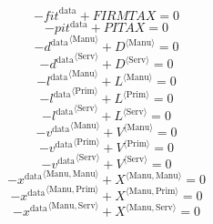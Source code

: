 \begin{equation}
-{f\!i\!t}^{\mathrm{data}} + {F\!I\!R\!M\!T\!A\!X} = 0
\end{equation}
\begin{equation}
-{p\!i\!t}^{\mathrm{data}} + {P\!I\!T\!A\!X} = 0
\end{equation}
\begin{equation}
-{d^{\mathrm{data}}}^{\langle \mathrm{\mathrm{Manu}}\rangle} + {D}^{\langle \mathrm{Manu}\rangle} = 0
\end{equation}
\begin{equation}
-{d^{\mathrm{data}}}^{\langle \mathrm{\mathrm{Serv}}\rangle} + {D}^{\langle \mathrm{Serv}\rangle} = 0
\end{equation}
\begin{equation}
-{l^{\mathrm{data}}}^{\langle \mathrm{\mathrm{Manu}}\rangle} + {L}^{\langle \mathrm{Manu}\rangle} = 0
\end{equation}
\begin{equation}
-{l^{\mathrm{data}}}^{\langle \mathrm{\mathrm{Prim}}\rangle} + {L}^{\langle \mathrm{Prim}\rangle} = 0
\end{equation}
\begin{equation}
-{l^{\mathrm{data}}}^{\langle \mathrm{\mathrm{Serv}}\rangle} + {L}^{\langle \mathrm{Serv}\rangle} = 0
\end{equation}
\begin{equation}
-{v^{\mathrm{data}}}^{\langle \mathrm{\mathrm{Manu}}\rangle} + {V}^{\langle \mathrm{Manu}\rangle} = 0
\end{equation}
\begin{equation}
-{v^{\mathrm{data}}}^{\langle \mathrm{\mathrm{Prim}}\rangle} + {V}^{\langle \mathrm{Prim}\rangle} = 0
\end{equation}
\begin{equation}
-{v^{\mathrm{data}}}^{\langle \mathrm{\mathrm{Serv}}\rangle} + {V}^{\langle \mathrm{Serv}\rangle} = 0
\end{equation}
\begin{equation}
-{x^{\mathrm{data}}}^{\langle \mathrm{\mathrm{Manu}},\mathrm{\mathrm{Manu}}\rangle} + {X}^{\langle \mathrm{Manu},\mathrm{Manu}\rangle} = 0
\end{equation}
\begin{equation}
-{x^{\mathrm{data}}}^{\langle \mathrm{\mathrm{Manu}},\mathrm{\mathrm{Prim}}\rangle} + {X}^{\langle \mathrm{Manu},\mathrm{Prim}\rangle} = 0
\end{equation}
\begin{equation}
-{x^{\mathrm{data}}}^{\langle \mathrm{\mathrm{Manu}},\mathrm{\mathrm{Serv}}\rangle} + {X}^{\langle \mathrm{Manu},\mathrm{Serv}\rangle} = 0
\end{equation}
